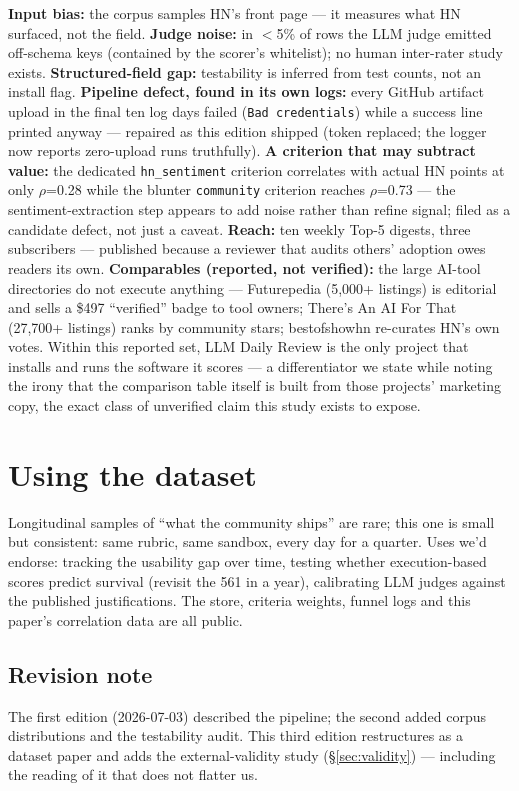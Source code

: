 \documentclass[10pt]{article}
\begin{document}
\textbf{Input bias:} the corpus samples HN's front page --- it measures what HN surfaced, not the field. \textbf{Judge noise:} in $<$5\% of rows the LLM judge emitted off-schema keys (contained by the scorer's whitelist); no human inter-rater study exists. \textbf{Structured-field gap:} testability is inferred from test counts, not an install flag. \textbf{Pipeline defect, found in its own logs:} every GitHub artifact upload in the final ten log days failed (\texttt{Bad credentials}) while a success line printed anyway --- repaired as this edition shipped (token replaced; the logger now reports zero-upload runs truthfully). \textbf{A criterion that may subtract value:} the dedicated \texttt{hn\_sentiment} criterion correlates with actual HN points at only $\rho$=0.28 while the blunter \texttt{community} criterion reaches $\rho$=0.73 --- the sentiment-extraction step appears to add noise rather than refine signal; filed as a candidate defect, not just a caveat. \textbf{Reach:} ten weekly Top-5 digests, three subscribers --- published because a reviewer that audits others' adoption owes readers its own. \textbf{Comparables (reported, not verified):} the large AI-tool directories do not execute anything --- Futurepedia (5{,}000+ listings) is editorial and sells a \$497 ``verified'' badge to tool owners; There's An AI For That (27{,}700+ listings) ranks by community stars; bestofshowhn re-curates HN's own votes. Within this reported set, LLM Daily Review is the only project that installs and runs the software it scores --- a differentiator we state while noting the irony that the comparison table itself is built from those projects' marketing copy, the exact class of unverified claim this study exists to expose.

\section{Using the dataset}
\label{sec:using}

Longitudinal samples of ``what the community ships'' are rare; this one is small but consistent: same rubric, same sandbox, every day for a quarter. Uses we'd endorse: tracking the usability gap over time, testing whether execution-based scores predict survival (revisit the 561 in a year), calibrating LLM judges against the published justifications. The store, criteria weights, funnel logs and this paper's correlation data are all public.

\subsection*{Revision note}
The first edition (2026-07-03) described the pipeline; the second added corpus distributions and the testability audit. This third edition restructures as a dataset paper and adds the external-validity study (\S\ref{sec:validity}) --- including the reading of it that does not flatter us.
\end{document}
